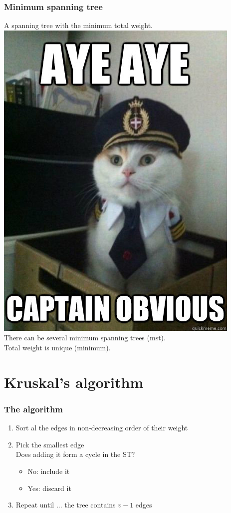 \documentclass[12pt]{beamer}
\begin{document}
\begin{frame}
\frametitle{Minimum spanning tree}
A spanning tree with the minimum total weight.\\
\pause
\includegraphics[width=0.4\linewidth]{img/captain-obvious}
\pause
\\There can be several minimum spanning trees (mst).\\
Total weight is unique (minimum).

\end{frame}

\section{Kruskal's algorithm}

\begin{frame}
\frametitle{The algorithm}
\begin{enumerate}
	\item Sort al the edges in non-decreasing order of their weight
	\item Pick the smallest edge\\
	Does adding it form a cycle in the ST?
	\begin{itemize}
		\item No:  include it
		\item Yes: discard it
	\end{itemize}
	\item Repeat until ...
	\pause
	the tree contains $v - 1$ edges
\end{enumerate}
\end{frame}
\end{document}

